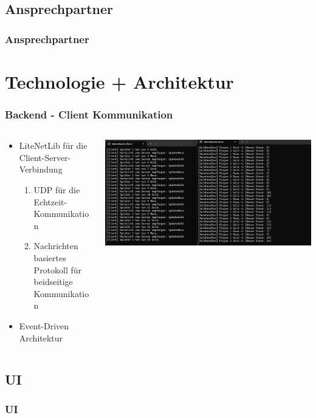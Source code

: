 \documentclass{beamer}
\begin{document}
\subsection{Ansprechpartner}
\begin{frame}
\frametitle{Ansprechpartner}

\end{frame}

\section{Technologie + Architektur}
\begin{frame}
\frametitle{Backend - Client Kommunikation}
\begin{columns}
  \begin{column}{0.55\textwidth}
    \begin{itemize}
      \item LiteNetLib für die Client-Server-Verbindung
      \begin{enumerate}
        \item UDP für die Echtzeit-Kommunikation
        \item Nachrichten basiertes Protokoll für beidseitige Kommunikation
      \end{enumerate}
      \item Event-Driven Architektur
    \end{itemize}
  \end{column}
  \begin{column}{0.7\textwidth}
    \includegraphics[width=\textwidth]{Server-Client-Logs.png}
  \end{column}
\end{columns}
\end{frame}

\subsection{UI}
\begin{frame}
  \frametitle{UI}
\end{frame}
\end{document}
